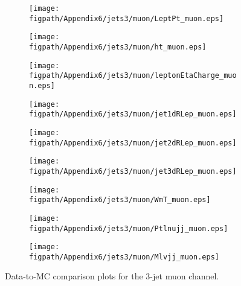 \begin{figure}[!hbtp]
    \centering
    \begin{subfigure}[t]{0.317\textwidth}
        \texttt{[image: \\figpath/Appendix6/jets3/muon/LeptPt\_muon.eps]}
    \end{subfigure}
    \begin{subfigure}[t]{0.317\textwidth}
        \texttt{[image: \\figpath/Appendix6/jets3/muon/ht\_muon.eps]}
    \end{subfigure}
    \begin{subfigure}[t]{0.317\textwidth}
        \texttt{[image: \\figpath/Appendix6/jets3/muon/leptonEtaCharge\_muon.eps]}
    \end{subfigure}

    \begin{subfigure}[t]{0.317\textwidth}
        \texttt{[image: \\figpath/Appendix6/jets3/muon/jet1dRLep\_muon.eps]}
    \end{subfigure}
    \begin{subfigure}[t]{0.317\textwidth}
        \texttt{[image: \\figpath/Appendix6/jets3/muon/jet2dRLep\_muon.eps]}
    \end{subfigure}
    \begin{subfigure}[t]{0.317\textwidth}
        \texttt{[image: \\figpath/Appendix6/jets3/muon/jet3dRLep\_muon.eps]}
    \end{subfigure}

    \begin{subfigure}[t]{0.317\textwidth}
        \texttt{[image: \\figpath/Appendix6/jets3/muon/WmT\_muon.eps]}
    \end{subfigure}
    \begin{subfigure}[t]{0.317\textwidth}
        \texttt{[image: \\figpath/Appendix6/jets3/muon/Ptlnujj\_muon.eps]}
    \end{subfigure}
    \begin{subfigure}[t]{0.317\textwidth}
        \texttt{[image: \\figpath/Appendix6/jets3/muon/Mlvjj\_muon.eps]}
    \end{subfigure}
    \caption{Data-to-MC comparison plots for the 3-jet muon channel.}
    \label{fig:comparison_plots_jets3_muon_2}
\end{figure}















